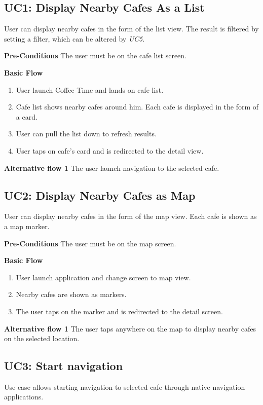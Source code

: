 \subsection{UC1: Display Nearby Cafes As a List}
User can display nearby cafes in the form of the list view. The result is filtered by setting a filter, which can be altered by \textit{UC5}.

\textbf{Pre-Conditions} The user must be on the cafe list screen.

\newpara
\textbf{Basic Flow}

\begin{enumerate}
    \item User launch Coffee Time and lands on cafe list.
    \item Cafe list shows nearby cafes around him. Each cafe is displayed in the form of a card.
    \item User can pull the list down to refresh results. 
    \item User taps on cafe's card and is redirected to the detail view.
\end{enumerate}

\textbf{Alternative flow 1} The user launch navigation to the selected cafe.


\subsection{UC2: Display Nearby Cafes as Map}
User can display nearby cafes in the form of the map view. Each cafe is shown as a map marker.

\textbf{Pre-Conditions} The user must be on the map screen.

\newpara
\textbf{Basic Flow}

\begin{enumerate}
    \item User launch application and change screen to map view. 
    \item Nearby cafes are shown as markers.
    \item The user taps on the marker and is redirected to the detail screen.
\end{enumerate}

\textbf{Alternative flow 1} The user taps anywhere on the map to display nearby cafes on the selected location.


\subsection{UC3: Start navigation}
Use case allows starting navigation to selected cafe through native navigation applications.

